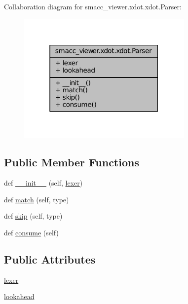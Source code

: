 Collaboration diagram for smacc\+\_\+viewer.\+xdot.\+xdot.\+Parser\+:
\nopagebreak
\begin{figure}[H]
\begin{center}
\leavevmode
\includegraphics[width=244pt]{classsmacc__viewer_1_1xdot_1_1xdot_1_1Parser__coll__graph}
\end{center}
\end{figure}
\subsection*{Public Member Functions}
\begin{DoxyCompactItemize}
\item 
def \hyperlink{classsmacc__viewer_1_1xdot_1_1xdot_1_1Parser_acebd6d3e20f17a8c93f0aef0162939b7}{\+\_\+\+\_\+init\+\_\+\+\_\+} (self, \hyperlink{classsmacc__viewer_1_1xdot_1_1xdot_1_1Parser_a62d14956c8f00404c642ce01c290c3d1}{lexer})
\item 
def \hyperlink{classsmacc__viewer_1_1xdot_1_1xdot_1_1Parser_acf6d95a1eaa50062589104985726ee90}{match} (self, type)
\item 
def \hyperlink{classsmacc__viewer_1_1xdot_1_1xdot_1_1Parser_ab6641c5df2047b92e65244eba82cb75d}{skip} (self, type)
\item 
def \hyperlink{classsmacc__viewer_1_1xdot_1_1xdot_1_1Parser_ab70715898a2ec0b51c6b333b73c78c37}{consume} (self)
\end{DoxyCompactItemize}
\subsection*{Public Attributes}
\begin{DoxyCompactItemize}
\item 
\hyperlink{classsmacc__viewer_1_1xdot_1_1xdot_1_1Parser_a62d14956c8f00404c642ce01c290c3d1}{lexer}
\item 
\hyperlink{classsmacc__viewer_1_1xdot_1_1xdot_1_1Parser_a02653f25a9384c30c847454e361ebad8}{lookahead}
\end{DoxyCompactItemize}


